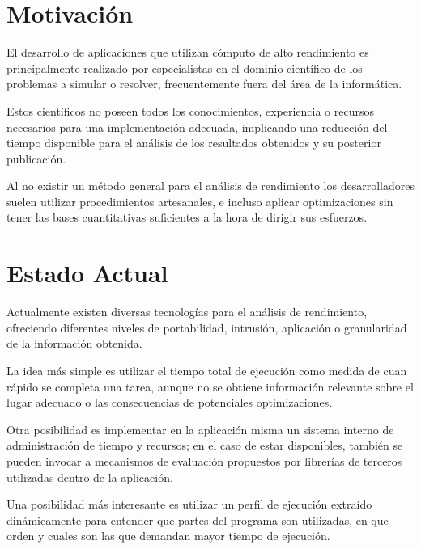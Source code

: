 \documentclass[a4paper,twocolumn]{article}
\begin{document}

\section{Motivaci\'on}

El desarrollo de aplicaciones que utilizan c\'omputo de alto rendimiento es
principalmente realizado por especialistas en el dominio cient\'ifico de los problemas
a simular o resolver, frecuentemente fuera del \'area de la inform\'atica.

\smallskip

Estos cient\'ificos no poseen todos los conocimientos, experiencia o recursos
necesarios para una implementaci\'on adecuada, implicando una reducci\'on del
tiempo disponible para el an\'alisis de los resultados obtenidos y su posterior publicaci\'on.

\smallskip

Al no existir un m\'etodo general para el an\'alisis de rendimiento los
desarrolladores suelen utilizar procedimientos artesanales, e incluso aplicar
optimizaciones sin tener las bases cuantitativas suficientes a la hora de dirigir sus esfuerzos.

\section{Estado Actual}

Actualmente existen diversas tecnolog\'ias para el an\'alisis de rendimiento,
ofreciendo diferentes niveles de portabilidad, intrusi\'on, aplicaci\'on o granularidad de la
informaci\'on obtenida.

\smallskip

La idea m\'as simple es utilizar el tiempo total de ejecuci\'on como medida de cuan
r\'apido se completa una tarea, aunque no se obtiene informaci\'on relevante sobre el lugar adecuado o
las consecuencias de potenciales optimizaciones.

\smallskip

Otra posibilidad es implementar en la aplicaci\'on misma un sistema interno de
administraci\'on de tiempo y recursos; en el caso de estar disponibles, tambi\'en se
pueden invocar a mecanismos de evaluaci\'on propuestos por librer\'ias de
terceros utilizadas dentro de la aplicaci\'on.

\smallskip

Una posibilidad m\'as interesante es utilizar un perfil de ejecuci\'on extra\'ido
din\'amicamente para entender que partes del programa son utilizadas, en que orden y cuales son
las que demandan mayor tiempo de ejecuci\'on.
\end{document}

